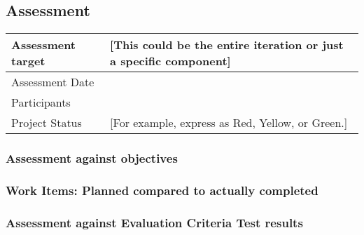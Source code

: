 \subsection*{Assessment}


\noindent\begin{tabular}{|l|l|}
\hline
Assessment target & [This could be the entire iteration or just a specific component]\\\hline
Assessment Date & \\\hline
Participants & \\\hline
Project Status & [For example, express as Red, Yellow, or Green.]\\\hline
\end{tabular}

\subsubsection*{Assessment against objectives}

\subsubsection*{Work Items: Planned compared to actually completed}

\subsubsection*{Assessment against Evaluation Criteria Test results}

